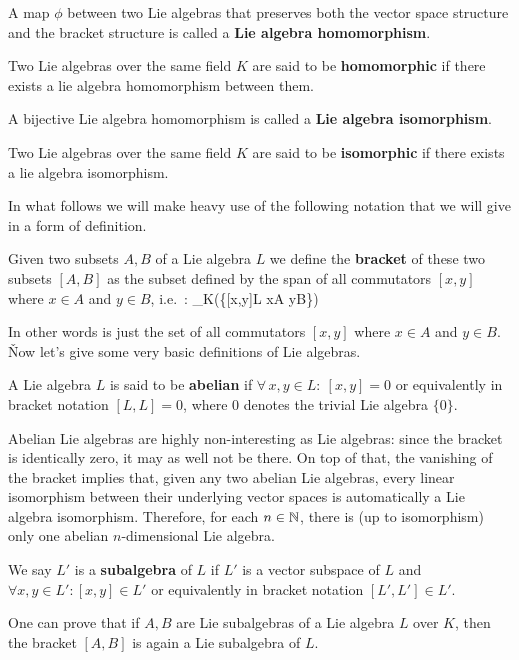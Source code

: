 A map $\phi$ between two Lie algebras that preserves both the vector space structure and the bracket structure is
called a \textbf{Lie algebra homomorphism}.
\ed

Two Lie algebras over the same field $K$ are said to be \textbf{homomorphic} if there exists a lie algebra
homomorphism between them.
\ed

A bijective Lie algebra homomorphism is called a \textbf{Lie algebra isomorphism}.
\ed

Two Lie algebras over the same field $K$ are said to be \textbf{isomorphic} if there exists a lie algebra isomorphism.
\ed

In what follows we will make heavy use of the following notation that we will give in a form of definition.

\bd [Bracket]
Given two subsets $A,B$ of a Lie algebra $L$ we define the \textbf{bracket} of these two subsets $[A,B]$ as the
subset defined by the span of all commutators $[x,y]$ where $x\in A$ and $y\in B$, i.e.\ :
\bse
[A,B] \coloneqq \lspan_K\bigl(\{[x,y]\in L \mid x\in A  y\in B\}\bigr)
\ese
\ed

In other words is just the set of all commutators $[x,y]$ where $x \in A$ and $y \in B$. \v

Now let's give some very basic definitions of Lie algebras.

A Lie algebra $L$ is said to be \textbf{abelian} if $\forall \, x,y \in L : \ [x,y] = 0$ or equivalently in bracket
notation $[L,L]=0$, where $0$ denotes the trivial Lie algebra $\{0\}$.
\ed

Abelian Lie algebras are highly non-interesting as Lie algebras: since the bracket is identically zero, it may as
well not be there. On top of that, the vanishing of the bracket implies that, given any two abelian Lie algebras,
every linear isomorphism between their underlying vector spaces is automatically a Lie algebra isomorphism.
Therefore, for each $n\in \mathbb{N}$, there is (up to isomorphism) only one abelian $n$-dimensional Lie algebra.

\bd [Subalgebra]
We say $L'$ is a \textbf{subalgebra} of $L$ if $L'$ is a vector subspace of $L$ and $\forall x,y \in L': [x,y] \in
L'$ or equivalently in bracket notation $[L',L'] \in L'$.
\ed

One can prove that if $A,B$ are Lie subalgebras of a Lie algebra $L$ over $K$, then the bracket $[A,B]$ is again a
Lie subalgebra of $L$.

